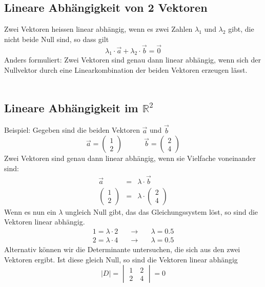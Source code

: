 \subsection{Lineare Abhängigkeit von 2 Vektoren}
Zwei Vektoren heissen linear abhängig, wenn es zwei Zahlen $\lambda_1$ und $\lambda_2$ gibt, die nicht beide Null sind, so dass gilt
\begin{equation*}
\lambda_1 \cdot \vec{a} + \lambda_2 \cdot \vec{b} = \vec{0}
\end{equation*}
Anders formuliert: 
Zwei Vektoren sind genau dann linear abhängig, wenn sich der Nullvektor durch eine Linearkombination der beiden Vektoren erzeugen lässt.\\\\
\subsection{Lineare Abhängigkeit im $\mathbb{R}^2$}
Beispiel: Gegeben sind die beiden Vektoren $\vec{a}$ und $\vec{b}$
\begin{equation*}
\vec{a} = \begin{pmatrix}1\\2\end{pmatrix} \quad\quad\quad \vec{b} = \begin{pmatrix}2\\4\end{pmatrix}
\end{equation*}
Zwei Vektoren sind genau dann linear abhängig, wenn sie Vielfache voneinander sind:
\begin{eqnarray*}
\vec{a} &=& \lambda \cdot \vec{b}\\
\begin{pmatrix}1\\2\end{pmatrix} &=& \lambda \cdot \begin{pmatrix}2\\4\end{pmatrix}
\end{eqnarray*}
Wenn es nun ein $\lambda$ ungleich Null gibt, das das Gleichungssystem löst, so sind die Vektoren linear abhängig.
\begin{eqnarray*}
1=\lambda \cdot 2 \quad &\to&\quad \lambda = 0.5\\
2=\lambda \cdot 4 \quad &\to&\quad \lambda = 0.5
\end{eqnarray*}
Alternativ können wir die Determinante untersuchen, die sich aus den zwei Vektoren ergibt. Ist diese gleich Null, so sind die Vektoren linear abhängig
\begin{equation*}
|D| = \begin{vmatrix}1\quad 2\\2\quad 4\end{vmatrix} = 0
\end{equation*}
